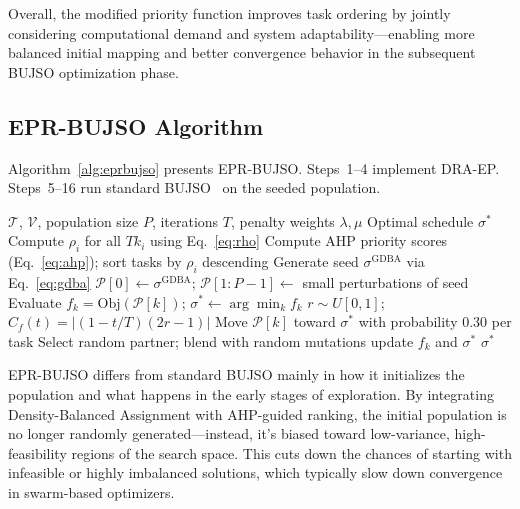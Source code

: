 \documentclass[journal]{IEEEtran}
\begin{document}
Overall, the modified priority function improves task ordering by jointly considering computational demand and system adaptability---enabling more balanced initial mapping and better convergence behavior in the subsequent BUJSO optimization phase.

\subsection{EPR-BUJSO Algorithm}

Algorithm~\ref{alg:eprbujso} presents EPR-BUJSO. Steps~1--4 implement DRA-EP.
Steps~5--16 run standard BUJSO~\cite{pachipala2024} on the seeded population.

\begin{algorithm}[H]
\caption{EPR-BUJSO for Cloud Task Scheduling}
\label{alg:eprbujso}
\begin{algorithmic}[1]
\Require $\mathcal{T}$, $\mathcal{V}$, population size $P$, iterations $T$,
         penalty weights $\lambda,\mu$
\Ensure Optimal schedule $\sigma^*$
\State Compute $\rho_i$ for all $Tk_i$ using Eq.~\eqref{eq:rho}
       \hfill{}
\State Compute AHP priority scores (Eq.~\eqref{eq:ahp}); sort tasks by $\rho_i$ descending
\State Generate seed $\sigma^{\mathrm{GDBA}}$ via Eq.~\eqref{eq:gdba}
       \hfill{}
\State $\mathcal{P}[0]\leftarrow\sigma^{\mathrm{GDBA}}$;\;
       $\mathcal{P}[1{:}P{-}1]\leftarrow$ small perturbations of seed
\State Evaluate $f_k=\mathrm{Obj}(\mathcal{P}[k])$;\;
       $\sigma^*\leftarrow\arg\min_k f_k$
  \State $r\sim U[0,1]$;\quad
         $C_f(t)=|(1-t/T)(2r-1)|$
      \State Move $\mathcal{P}[k]$ toward $\sigma^*$ with probability 0.30 per task
    \Else{}
      \State Select random partner; blend with random mutations
    \EndIf
     update $f_k$ and $\sigma^*$
    \EndIf
  \EndFor
\EndFor
\State \Return $\sigma^*$
\end{algorithmic}
\end{algorithm}

EPR-BUJSO differs from standard BUJSO mainly in how it initializes the population and what happens in the early stages of exploration. By integrating Density-Balanced Assignment with AHP-guided ranking, the initial population is no longer randomly generated---instead, it's biased toward low-variance, high-feasibility regions of the search space. This cuts down the chances of starting with infeasible or highly imbalanced solutions, which typically slow down convergence in swarm-based optimizers.
\end{document}
